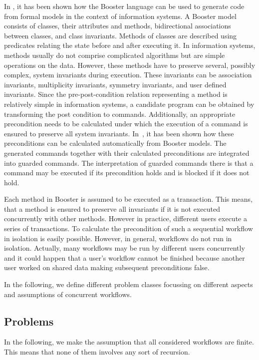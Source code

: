 \documentclass[11pt]{article}
\begin{document}
In \cite{Faitelson2007}, it has been shown how the Booster language can be used to generate code from formal models in the context of information systems. A Booster model consists of classes, their attributes and methods, bidirectional associations between classes, and class invariants. Methods of classes are described using predicates relating the state before and after executing it. In information systems, methods usually do not comprise complicated algorithms but are simple operations on the data. However, these methods have to preserve several, possibly complex, system invariants during execution. These invariants can be association invariants, multiplicity invariants, symmetry invariants, and user defined invariants. Since the pre-post-condition relation representing a method is relatively simple in information systems, a candidate program can be obtained by transforming the post condition to commands. Additionally, an appropriate precondition needs to be calculated under which the execution of a command is ensured to preserve all system invariants. In~\cite{Welch2005,Welch2008}, it has been shown how these preconditions can be calculated automatically from Booster models. The generated commands together with their calculated preconditions are integrated into guarded commands. The interpretation of guarded commands there is that a command may be executed if its precondition holds and is blocked if it does not hold.

Each method in Booster is assumed to be executed as a transaction. This means, that a method is ensured to preserve all invariants if it is not executed concurrently with other methods. However in practice, different users execute a series of transactions. To calculate the precondition of such a sequential workflow in isolation is easily possible. However, in general, workflows do not run in isolation. Actually, many workflows may be run by different users concurrently and it could happen that a user's workflow cannot be finished because another user worked on shared data making subsequent preconditions false.

In the following, we define different problem classes focussing on different aspects and assumptions of concurrent workflows. 

\subsection{Problems}

In the following, we make the assumption that all considered workflows are finite. This means that none of them involves any sort of recursion.
\end{document}
